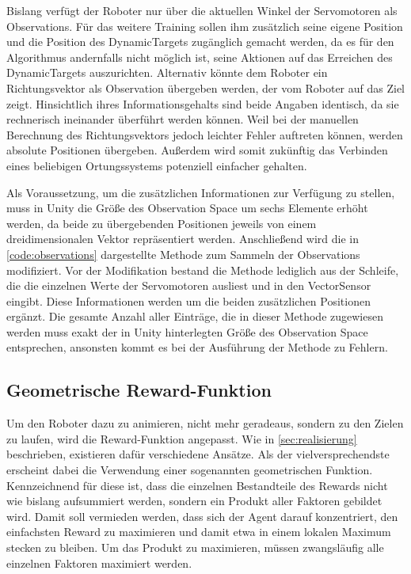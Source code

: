 Bislang verfügt der Roboter nur über die aktuellen Winkel der Servomotoren als Observations.
Für das weitere Training sollen ihm zusätzlich seine eigene Position und die Position des DynamicTargets zugänglich gemacht werden, da es für den Algorithmus andernfalls nicht möglich ist, seine Aktionen auf das Erreichen des DynamicTargets auszurichten.
Alternativ könnte dem Roboter ein Richtungsvektor als Observation übergeben werden, der vom Roboter auf das Ziel zeigt.
Hinsichtlich ihres Informationsgehalts sind beide Angaben identisch, da sie rechnerisch ineinander überführt werden können.
Weil bei der manuellen Berechnung des Richtungsvektors jedoch leichter Fehler auftreten können, werden absolute Positionen übergeben.
Außerdem wird somit zukünftig das Verbinden eines beliebigen Ortungssystems potenziell einfacher gehalten.

Als Voraussetzung, um die zusätzlichen Informationen zur Verfügung zu stellen, muss in Unity die Größe des Observation Space um sechs Elemente erhöht werden, da beide zu übergebenden Positionen jeweils von einem dreidimensionalen Vektor repräsentiert werden.
Anschließend wird die in \autoref{code:observations} dargestellte Methode zum Sammeln der Observations modifiziert.
Vor der Modifikation bestand die Methode lediglich aus der Schleife, die die einzelnen Werte der Servomotoren ausliest und in den VectorSensor eingibt.
Diese Informationen werden um die beiden zusätzlichen Positionen ergänzt.
Die gesamte Anzahl aller Einträge, die in dieser Methode zugewiesen werden muss exakt der in Unity hinterlegten Größe des Observation Space entsprechen, ansonsten kommt es bei der Ausführung der Methode zu Fehlern.

\begin{figure}
    
\end{figure}

\subsection{Geometrische Reward-Funktion}
Um den Roboter dazu zu animieren, nicht mehr geradeaus, sondern zu den Zielen zu laufen, wird die Reward-Funktion angepasst.
Wie in \autoref{sec:realisierung} beschrieben, existieren dafür verschiedene Ansätze.
Als der vielversprechendste erscheint dabei die Verwendung einer sogenannten geometrischen Funktion.
Kennzeichnend für diese ist, dass die einzelnen Bestandteile des Rewards nicht wie bislang aufsummiert werden, sondern ein Produkt aller Faktoren gebildet wird.
Damit soll vermieden werden, dass sich der Agent darauf konzentriert, den einfachsten Reward zu maximieren und damit etwa in einem lokalen Maximum stecken zu bleiben.
Um das Produkt zu maximieren, müssen zwangsläufig alle einzelnen Faktoren maximiert werden.

